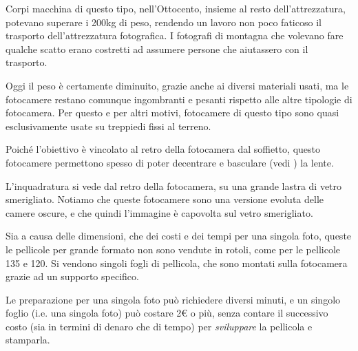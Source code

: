Corpi macchina di questo tipo, nell'Ottocento, insieme al resto dell'attrezzatura, potevano superare i 200kg di peso, rendendo un lavoro non poco faticoso il trasporto dell'attrezzatura fotografica.
I fotografi di montagna che volevano fare qualche scatto erano costretti ad assumere persone che aiutassero con il trasporto.

Oggi il peso è certamente diminuito, grazie anche ai diversi materiali usati, ma le fotocamere restano comunque ingombranti e pesanti rispetto alle altre tipologie di fotocamera.
Per questo e per altri motivi, fotocamere di questo tipo sono quasi esclusivamente usate su treppiedi fissi al terreno.

Poiché l'obiettivo è vincolato al retro della fotocamera dal soffietto, questo fotocamere permettono spesso di poter decentrare e basculare (vedi ) la lente.

L'inquadratura si vede dal retro della fotocamera, su una grande lastra di vetro smerigliato. Notiamo che queste fotocamere sono una versione evoluta delle camere oscure, e che quindi l'immagine è capovolta sul vetro smerigliato.

Sia a causa delle dimensioni, che dei costi e dei tempi per una singola foto, queste le pellicole per grande formato non sono vendute in rotoli, come per le pellicole 135 e 120.
Si vendono singoli fogli di pellicola, che sono montati sulla fotocamera grazie ad un supporto specifico.

Le preparazione per una singola foto può richiedere diversi minuti, e un singolo foglio (i.e. una singola foto) può costare 2$\euro$ o più, senza contare il successivo costo (sia in termini di denaro che di tempo) per \textit{sviluppare} la pellicola e stamparla.